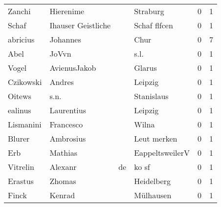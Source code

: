 \begin{tabular}{llllrr}
                   Zanchi &                          Hierenime &             &                                    Straburg &          0 &         1 \\
                    Schaf &                 Ihauser Geistliche &             &                                Schaf flfcen &          0 &         1 \\
                 abricius &                           Johannes &             &                                        Chur &          0 &         7 \\
                     Abel &                              JoVvn &             &                                        s.l. &          0 &         1 \\
                    Vogel &                       AvienusJakob &             &                                      Glarus &          0 &         1 \\
                Czikowski &                             Andres &             &                                     Leipzig &          0 &         1 \\
                   Oitews &                               s.n. &             &                                  Stanislaus &          0 &         1 \\
                  ealinus &                         Laurentius &             &                                     Leipzig &          0 &         1 \\
                Lismanini &                          Francesco &             &                                       Wilna &          0 &         1 \\
                   Blurer &                          Ambrosius &             &                                 Leut merken &          0 &         1 \\
                      Erb &                            Mathias &             &                             EappeltsweilerV &          0 &         1 \\
                 Vitrelin &                            Alexanr &          de &                                       ko sf &          0 &         1 \\
                  Erastus &                             Zhomas &             &                                  Heidelberg &          0 &         1 \\
                    Finck &                             Kenrad &             &                                   Mülhausen &          0 &         1 \\

\end{tabular}
